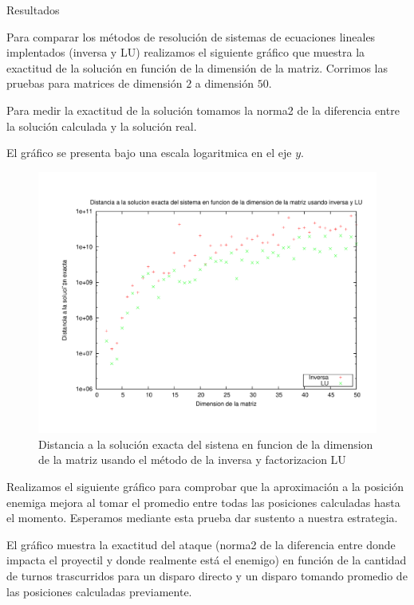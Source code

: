 \begin{section}{Resultados}
	\VSP
	
	Para comparar los métodos de resolución de sistemas de ecuaciones lineales implentados (inversa y LU) realizamos el siguiente gráfico que muestra la exactitud de la solución en función de la dimensión de la matriz. Corrimos las pruebas para matrices de dimensión $2$ a dimensión $50$.
	
	Para medir la exactitud de la solución tomamos la norma2 de la diferencia entre la solución calculada y la solución real.
	
	El gráfico se presenta bajo una escala logaritmica en el eje $y$.
	
	\begin{figure}[H]
	  \centering
		\includegraphics[width=14cm]{graficos/inv_vs_lu.pdf}
	  \caption{Distancia a la solución exacta del sistena en funcion de la dimension de la matriz usando el método de la inversa y factorizacion LU}
	  \label{fig:inv_vs_lu}
	\end{figure}
	
	\VSP
	
	
	Realizamos el siguiente gráfico para comprobar que la aproximación a la posición enemiga mejora al tomar el promedio entre todas las posiciones calculadas hasta el momento. Esperamos mediante esta prueba dar sustento a nuestra estrategia.
	
	El gráfico muestra la exactitud del ataque (norma2 de la diferencia entre donde impacta el proyectil y donde realmente está el enemigo) en función de la cantidad de turnos trascurridos para un disparo directo y un disparo tomando promedio de las posiciones calculadas previamente.
	
	
	
\end{section}
